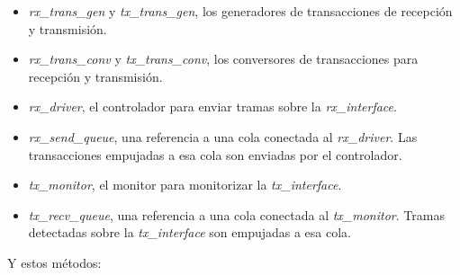\documentclass[a4paper, twoside, 11pt]{report}
\begin{document}
\begin{itemize}
  \item \textit{rx\_trans\_gen} y \textit{tx\_trans\_gen}, los generadores de transacciones de recepción y transmisión.
  \item \textit{rx\_trans\_conv} y \textit{tx\_trans\_conv}, los conversores de transacciones para recepción y transmisión.
  \item \textit{rx\_driver}, el controlador para enviar tramas sobre la \textit{rx\_interface}.
  \item \textit{rx\_send\_queue}, una referencia a una cola conectada al \textit{rx\_driver}. Las transacciones empujadas a esa cola son enviadas por el controlador.
  \item \textit{tx\_monitor}, el monitor para monitorizar la \textit{tx\_interface}.
  \item \textit{tx\_recv\_queue}, una referencia a una cola conectada al \textit{tx\_monitor}. Tramas detectadas sobre la \textit{tx\_interface} son empujadas a esa cola.
\end{itemize}

Y estos métodos:
\end{document}
